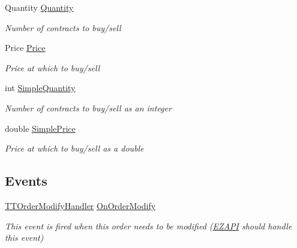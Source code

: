 \begin{DoxyCompactItemize}
Quantity \hyperlink{class_e_z_a_p_i_1_1_containers_1_1_t_t_order_a0c797bc9194b17026dc9023bf15aad17}{Quantity}
\begin{DoxyCompactList}\small\item\em Number of contracts to buy/sell \end{DoxyCompactList}\item 
Price \hyperlink{class_e_z_a_p_i_1_1_containers_1_1_t_t_order_a77d4a6274c77f8998f7b68e57bb0538a}{Price}
\begin{DoxyCompactList}\small\item\em Price at which to buy/sell \end{DoxyCompactList}\item 
int \hyperlink{class_e_z_a_p_i_1_1_containers_1_1_t_t_order_af0938ed68ec7972dabe4cc4bd89b9c6b}{Simple\-Quantity}
\begin{DoxyCompactList}\small\item\em Number of contracts to buy/sell as an integer \end{DoxyCompactList}\item 
double \hyperlink{class_e_z_a_p_i_1_1_containers_1_1_t_t_order_a09e6c6a224c8029cc51aaeefad557cca}{Simple\-Price}
\begin{DoxyCompactList}\small\item\em Price at which to buy/sell as a double \end{DoxyCompactList}\end{DoxyCompactItemize}
\subsection*{Events}
\begin{DoxyCompactItemize}
\item 
\hyperlink{namespace_e_z_a_p_i_1_1_containers_aeae814d91b819efed065a366c6f45cf2}{T\-T\-Order\-Modify\-Handler} \hyperlink{class_e_z_a_p_i_1_1_containers_1_1_t_t_order_af8ea72d173cc82c929ad27d2f0bc3df2}{On\-Order\-Modify}
\begin{DoxyCompactList}\small\item\em This event is fired when this order needs to be modified (\hyperlink{namespace_e_z_a_p_i}{E\-Z\-A\-P\-I} should handle this event) \end{DoxyCompactList}\end{DoxyCompactItemize}


